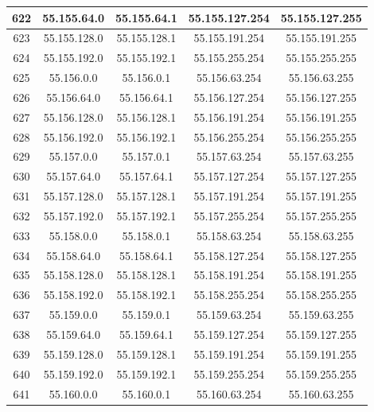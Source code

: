 \documentclass[letterpaper,12pt]{article}
\begin{document}
\begin{center}
\begin{longtable}{|c|c|c|c|c|}
                622 & 55.155.64.0 & 55.155.64.1 & 55.155.127.254 & 55.155.127.255 \\ \hline
                623 & 55.155.128.0 & 55.155.128.1 & 55.155.191.254 & 55.155.191.255 \\ \hline
                624 & 55.155.192.0 & 55.155.192.1 & 55.155.255.254 & 55.155.255.255 \\ \hline
                625 & 55.156.0.0 & 55.156.0.1 & 55.156.63.254 & 55.156.63.255 \\ \hline
                626 & 55.156.64.0 & 55.156.64.1 & 55.156.127.254 & 55.156.127.255 \\ \hline
                627 & 55.156.128.0 & 55.156.128.1 & 55.156.191.254 & 55.156.191.255 \\ \hline
                628 & 55.156.192.0 & 55.156.192.1 & 55.156.255.254 & 55.156.255.255 \\ \hline
                629 & 55.157.0.0 & 55.157.0.1 & 55.157.63.254 & 55.157.63.255 \\ \hline
                630 & 55.157.64.0 & 55.157.64.1 & 55.157.127.254 & 55.157.127.255 \\ \hline
                631 & 55.157.128.0 & 55.157.128.1 & 55.157.191.254 & 55.157.191.255 \\ \hline
                632 & 55.157.192.0 & 55.157.192.1 & 55.157.255.254 & 55.157.255.255 \\ \hline
                633 & 55.158.0.0 & 55.158.0.1 & 55.158.63.254 & 55.158.63.255 \\ \hline
                634 & 55.158.64.0 & 55.158.64.1 & 55.158.127.254 & 55.158.127.255 \\ \hline
                635 & 55.158.128.0 & 55.158.128.1 & 55.158.191.254 & 55.158.191.255 \\ \hline
                636 & 55.158.192.0 & 55.158.192.1 & 55.158.255.254 & 55.158.255.255 \\ \hline
                637 & 55.159.0.0 & 55.159.0.1 & 55.159.63.254 & 55.159.63.255 \\ \hline
                638 & 55.159.64.0 & 55.159.64.1 & 55.159.127.254 & 55.159.127.255 \\ \hline
                639 & 55.159.128.0 & 55.159.128.1 & 55.159.191.254 & 55.159.191.255 \\ \hline
                640 & 55.159.192.0 & 55.159.192.1 & 55.159.255.254 & 55.159.255.255 \\ \hline
                641 & 55.160.0.0 & 55.160.0.1 & 55.160.63.254 & 55.160.63.255 \\ \hline

\end{longtable}
\end{center}
\end{document}
